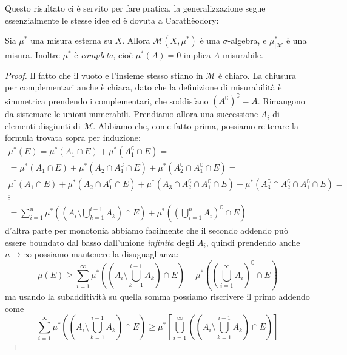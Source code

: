 \documentclass[11pt]{scrartcl}
\begin{document}
	Questo risultato ci è servito per fare pratica, la generalizzazione segue essenzialmente le stesse idee ed è dovuta a Carathèodory:
	\begin{theorem}[Carathèodory]
		Sia $\mu^*$ una misura esterna su $X$. Allora $\mathcal{M}(X,\mu^*)$ è una $\sigma$-algebra, e $\mu^*_{\mid \mathcal{M}}$ è una misura. Inoltre $\mu^*$ è \textit{completa}, cioè $\mu^*(A)=0$ implica $A$ misurabile.
	\end{theorem}
	\begin{proof}
		Il fatto che il vuoto e l'insieme stesso stiano in $\mathcal{M}$ è chiaro. La chiusura per complementari anche è chiara, dato che la definizione di misurabilità è simmetrica prendendo i complementari, che soddisfano $\left(A^\complement\right)^\complement=A$. Rimangono da sistemare le unioni numerabili. Prendiamo allora una successione $A_i$ di elementi disgiunti di $\mathcal{M}$. Abbiamo che, come fatto prima, possiamo reiterare la formula trovata sopra per induzione:
		\begin{align*}
			\mu^*(E)=\mu^*\left(A_1\cap E\right)+\mu^*\left(A_1^\complement \cap E\right) = & \\
			=\mu^*(A_1\cap E)+\mu^*\left(A_2\cap A_1^\complement \cap E\right)+\mu^*\left(A_2^\complement \cap A_1^\complement \cap E\right) = & \\
			\mu^*(A_1\cap E)+\mu^*\left(A_2\cap A_1^\complement  \cap E\right)+\mu^*\left(A_3\cap A_2^\complement \cap A_1^\complement\cap E\right)+\mu^*\left(A_3^\complement \cap A_2^\complement \cap A_1^\complement \cap E\right)= & \\
			\vdots \quad \quad \qquad \qquad \qquad\\
			= \sum_{i=1}^{n}\mu^*\left(\left(A_i\setminus \bigcup_{k=1}^{i-1}A_k\right)\cap E\right)+\mu^*\left(\left(\bigcup_{i=1}^n A_i\right)^\complement \cap E\right) &
		\end{align*}
		d'altra parte per monotonia abbiamo facilmente che il secondo addendo può essere boundato dal basso dall'unione \textit{infinita} degli $A_i$, quindi prendendo anche $n\to \infty$ possiamo mantenere la disuguaglianza:
		\begin{equation}\label{Misure:formula fondamentale Carathèodory}
			\mu(E)\ge \sum_{i=1}^{\infty}\mu^*\left(\left(A_i\setminus \bigcup_{k=1}^{i-1}A_k\right)\cap E\right)+\mu^*\left(\left(\bigcup_{i=1}^\infty A_i\right)^\complement \cap E\right)
		\end{equation}
		ma usando la subadditività su quella somma possiamo riscrivere il primo addendo come 
		$$\sum_{i=1}^{\infty}\mu^*\left(\left(A_i\setminus \bigcup_{k=1}^{i-1}A_k\right)\cap E\right)\ge \mu^*\left[\bigcup_{i=1}^\infty\left(\left(A_i\setminus \bigcup_{k=1}^{i-1}A_k\right)\cap E\right)\right]$$

\end{proof}
\end{document}
